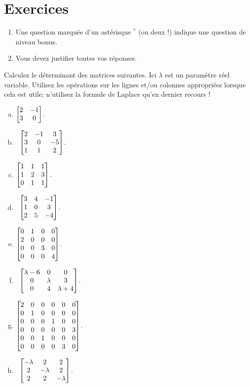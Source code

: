 \section*{Exercices}


\begin{enumerate}
\item Une question marquée d'un astérisque $ ^\ast$ (ou deux !) indique une question de niveau bonus.
 \item Vous devez justifier toutes vos réponses.
\end{enumerate}
\bigskip



\begin{prob} \label{prob21.1} Calculez le déterminant des matrices suivantes. Ici $\lambda$ est un paramètre réel variable. Utilisez les opérations sur les lignes et/ou colonnes appropriées lorsque cela est utile; n'utilisez la formule de Laplace qu'en dernier recours !
\medskip
\begin{enumerate}[a)]
\item 
$\bmatrix
2&-1\\3&0 \endbmatrix $.
\medskip


\item\sov~$\bmatrix 
2&-1&3\\3&0&-5\\1&1&2 \endbmatrix $.
\medskip
\item 
$\bmatrix
1&1&1\\1&2&3\\0&1&1 \endbmatrix $.
\medskip
\item\sov~$\bmatrix 3&4&-
1\\1&0&3\\2&5&-4\endbmatrix$.\medskip
\item 
$\bmatrix 0&1&0&0\\
2&0&0&0\\
0&0&3&0\\
0&0&0&4\\
\endbmatrix$.
\medskip
\item\sov~$\bmatrix \lambda-6&0&0\\0&\lambda&3\\0&4&\lambda+4\endbmatrix $.\medskip
 \item $\bmatrix 2&0&0&0&0&0\cr0&1&0&0&0&0\cr0&0&0&1&0&0\cr
0&0&0&0&0&3\cr0&0&1&0&0&0\cr0&0&0&0&3&0\endbmatrix$.
\medskip

\item\sov~$\bmatrix
-\lambda&2&2\\ 2&-\lambda&2\\ 2&2&-\lambda \endbmatrix$.
\medskip 



\end{enumerate}
\end{prob}
